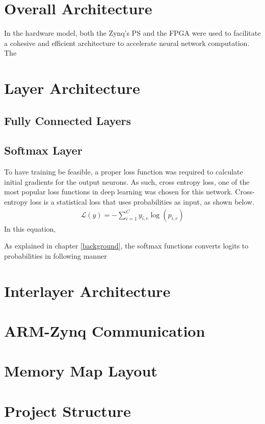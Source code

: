 \section{Overall Architecture}
In the hardware model, both the Zynq's PS and the FPGA were used to facilitate a cohesive and efficient architecture to accelerate neural network computation. The 

\section{Layer Architecture}
\subsection{Fully Connected Layers}
\subsection{Softmax Layer}
To have training be feasible, a proper loss function was required to calculate initial gradients for the output neurons. As such, cross entropy loss, one of the most popular loss functions in deep learning was chosen for this network. Cross-entropy loss is a statistical loss that uses probabilities as input, as shown below.
\begin{align}
\mathcal{L}(y) = - \sum_{i = 1}^{C}y_{i,c}\log(p_{i,c})
\end{align}
In this equation, 

As explained in chapter \ref{background}, the softmax functions converts logits to probabilities in following manner

\section{Interlayer Architecture}
\section{ARM-Zynq Communication}
\section{Memory Map Layout}
\section{Project Structure}


